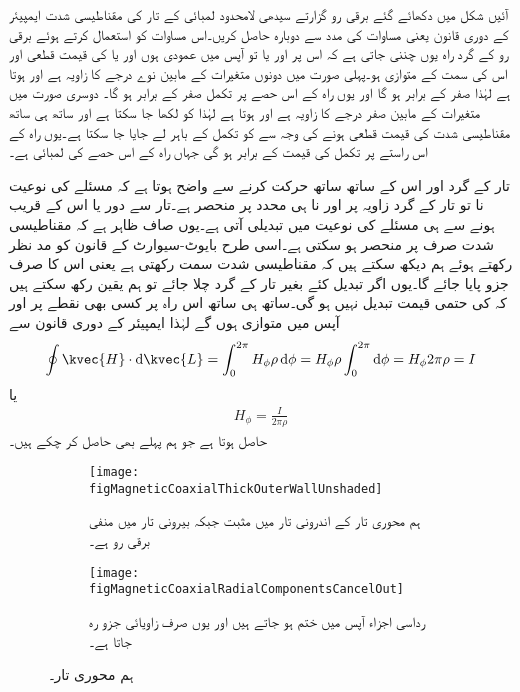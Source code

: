 آئیں شکل  میں دکھائے گئے  برقی رو گزارتے سیدھی لامحدود لمبائی کے تار کی مقناطیسی شدت ایمپیئر کے دوری قانون یعنی مساوات  کی مدد سے دوبارہ حاصل کریں۔اس مساوات کو استعمال کرتے ہوئے  برقی رو کے گرد راہ یوں چننی جاتی ہے کہ اس پر  اور  یا تو آپس میں عمودی ہوں اور یا  کی قیمت قطعی اور اس کی سمت  کے متوازی ہو۔پہلی صورت میں دونوں متغیرات کے مابین نوے درجے کا زاویہ  ہے اور  ہوتا ہے لہٰذا  صفر کے برابر ہو گا اور یوں راہ کے اس حصے پر تکمل صفر کے برابر ہو گا۔ دوسری صورت میں متغیرات کے مابین صفر درجے کا زاویہ ہے اور  ہوتا ہے لہٰذا   کو  لکھا جا سکتا ہے اور ساتھ ہی ساتھ مقناطیسی شدت کی قیمت قطعی ہونے کی وجہ سے  کو تکمل کے باہر لے جایا جا سکتا ہے۔یوں راہ کے اس راستے پر تکمل کی قیمت  کے برابر ہو گی جہاں  راہ کے اس حصے کی لمبائی ہے۔

تار کے گرد اور اس کے ساتھ ساتھ حرکت کرنے سے واضح ہوتا ہے کہ مسئلے کی نوعیت نا تو تار کے گرد زاویہ  پر اور نا ہی محدد  پر منحصر ہے۔تار سے دور یا اس کے قریب ہونے سے ہی مسئلے کی نوعیت میں تبدیلی آتی ہے۔یوں صاف ظاہر ہے کہ مقناطیسی شدت صرف  پر منحصر ہو سکتی ہے۔اسی طرح بایوٹ-سیوارٹ کے قانون کو مد نظر رکھتے ہوئے ہم دیکھ سکتے ہیں کہ مقناطیسی شدت  سمت رکھتی ہے یعنی اس کا صرف  جزو پایا جائے گا۔یوں اگر  تبدیل کئے بغیر تار کے گرد چلا جائے تو ہم یقین رکھ سکتے ہیں کہ  کی حتمی قیمت  تبدیل نہیں ہو گی۔ساتھ ہی ساتھ اس راہ پر کسی بھی نقطے پر   اور  آپس میں متوازی ہوں گے لہٰذا ایمپیئر کے دوری قانون سے
\begin{align*}
\oint \kvec{H} \cdot \dif \kvec{L}=\int_0^{2\pi} H_{\phi} \rho \dif \phi=H_{\phi} \rho \int_0^{2\pi} \dif \phi=H_{\phi} 2\pi \rho=I
\end{align*}
یا
\begin{align*}
H_{\phi}=\frac{I}{2\pi \rho}
\end{align*}
حاصل ہوتا ہے جو ہم پہلے بھی حاصل کر چکے ہیں۔
\begin{figure}
\centering
\begin{subfigure}{0.5\textwidth}
\centering
\texttt{[image: figMagneticCoaxialThickOuterWallUnshaded]}
\caption{ہم محوری تار کے اندرونی تار میں مثبت جبکہ بیرونی تار میں منفی برقی رو ہے۔}
\label{شکل_مقناطیسی_ہم_محوری_تار_مثبت_منفی_رو}
\end{subfigure}%
\begin{subfigure}{0.5\textwidth}
\centering
\texttt{[image: figMagneticCoaxialRadialComponentsCancelOut]}
\caption{رداسی اجزاء آپس میں ختم ہو جاتے ہیں اور یوں صرف زاویائی جزو رہ جاتا ہے۔}
\label{شکل_مقناطیسی_ہم_محوری_صرف_زاویائی_جزو}
\end{subfigure}%
\caption{ہم محوری تار۔}
\label{شکل_مقناطیسی_ہم_محوری_تار}
\end{figure}

